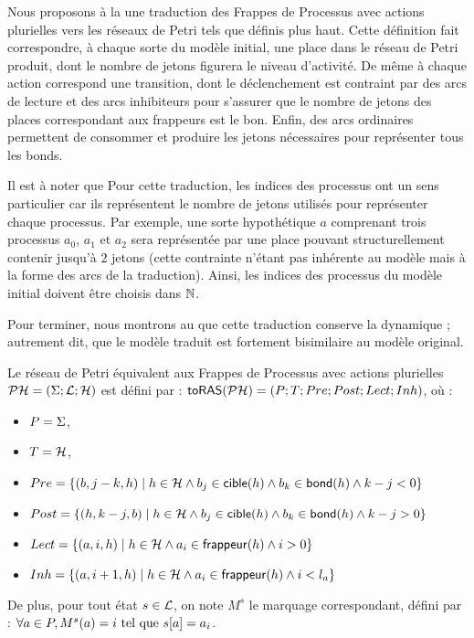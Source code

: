Nous proposons à la  une traduction des Frappes de Processus avec actions
plurielles vers les réseaux de Petri tels que définis plus haut.
Cette définition fait correspondre, à chaque sorte du modèle initial,
une place dans le réseau de Petri produit,
dont le nombre de jetons figurera le niveau d'activité.
De même à chaque action correspond une transition, dont le déclenchement
est contraint par des arcs de lecture et des arcs inhibiteurs pour s'assurer
que le nombre de jetons des places correspondant aux frappeurs est le bon.
Enfin, des arcs ordinaires permettent de consommer et produire les jetons
nécessaires pour représenter tous les bonds.

Il est à noter que Pour cette traduction, les indices des processus ont un sens particulier
car ils représentent le nombre de jetons utilisés pour représenter chaque processus.
Par exemple, une sorte hypothétique $a$ comprenant trois processus $a_0$, $a_1$ et $a_2$
sera représentée par une place pouvant structurellement contenir jusqu'à $2$ jetons
(cette contrainte n'étant pas inhérente au modèle mais à la forme des arcs de la traduction).
Ainsi, les indices des processus du modèle initial doivent être choisis dans $\mathbb{N}$.

Pour terminer, nous montrons au  que cette traduction
conserve la dynamique ;
autrement dit, que le modèle traduit est fortement bisimilaire au modèle original.

\begin{definition}
  Le réseau de Petri équivalent aux Frappes de Processus
  avec actions plurielles $\mathcal{PH} = (\Sigma; \mathcal{L}; \mathcal{H})$
  est défini par : $\mathsf{toRAS}(\mathcal{PH}) = (P; T; Pre; Post; Lect; Inh)$, où :
  \begin{itemize}
    \item $P = \Sigma$,
    \item $T = \mathcal{H}$,
    \item $Pre = \{ (b, j-k, h) \mid h \in \mathcal{H} \wedge b_j \in \mathsf{cible}(h) \wedge
      b_k \in \mathsf{bond}(h) \wedge k-j < 0 \}$
    \item $Post = \{ (h, k-j, b) \mid h \in \mathcal{H} \wedge b_j \in \mathsf{cible}(h) \wedge
      b_k \in \mathsf{bond}(h) \wedge k-j > 0 \}$
    \item $Lect = \{ (a, i, h) \mid h \in \mathcal{H} \wedge a_i \in \mathsf{frappeur}(h) \wedge i > 0 \}$
    \item $Inh = \{ (a, i+1, h) \mid h \in \mathcal{H} \wedge a_i \in \mathsf{frappeur}(h) \wedge i < l_a \}$
  \end{itemize}
  De plus, pour tout état $s \in \mathcal{L}$, on note
  $M^s$ le marquage correspondant, défini par :
  $\forall a \in P, M^s(a) = i \text{ tel que } {s[a]} = a_i$.
\end{definition}

